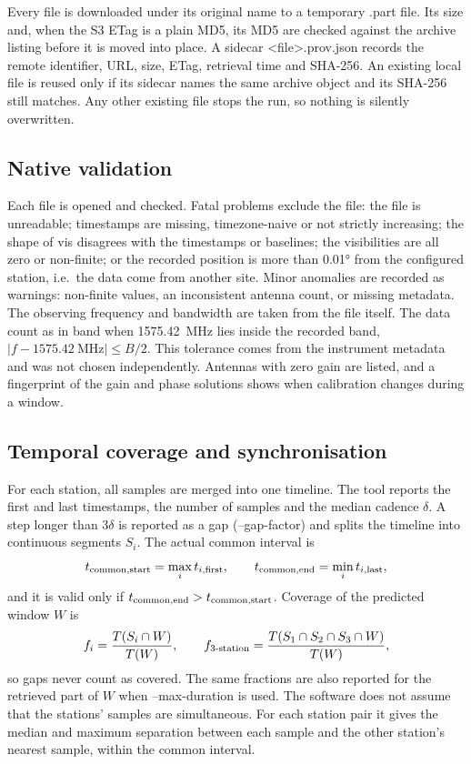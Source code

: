 \documentclass[11pt,a4paper]{article}
\newcommand{\code}[1]{{\ttfamily\def\_{\textunderscore\allowbreak}#1}}
\begin{document}
Every file is downloaded under its original name to a temporary
\code{.part} file. Its size and, when the S3 ETag is a plain MD5, its MD5
are checked against the archive listing before it is moved into place. A
sidecar \code{<file>.prov.json} records the remote identifier, URL, size,
ETag, retrieval time and SHA-256. An existing local file is reused only if
its sidecar names the same archive object and its SHA-256 still matches.
Any other existing file stops the run, so nothing is silently overwritten.

\subsection{Native validation}

Each file is opened and checked. Fatal problems exclude the file: the file
is unreadable; timestamps are missing, timezone-naive or not strictly
increasing; the shape of \code{vis} disagrees with the timestamps or
baselines; the visibilities are all zero or non-finite; or the recorded
position is more than \ang{0.01} from the configured station, i.e.\ the data
come from another site. Minor anomalies are recorded as warnings:
non-finite values, an inconsistent antenna count, or missing metadata.
The observing frequency and bandwidth are taken from the file itself. The
data count as in band when \SI{1575.42}{\mega\hertz} lies inside the
recorded band, $|f-\SI{1575.42}{\mega\hertz}|\le B/2$. This tolerance comes
from the instrument metadata and was not chosen independently. Antennas
with zero gain are listed, and a fingerprint of the gain and phase
solutions shows when calibration changes during a window.

\subsection{Temporal coverage and synchronisation}

For each station, all samples are merged into one timeline. The tool reports
the first and last timestamps, the number of samples and the median cadence
$\delta$. A step longer than $3\delta$ is reported as a gap
(\code{--gap-factor}) and splits the timeline into continuous segments
$S_i$. The actual common interval is
\begin{equation}
t_{\rm common,start}=\max_i t_{i,\rm first},\qquad
t_{\rm common,end}=\min_i t_{i,\rm last},
\end{equation}
and it is valid only if $t_{\rm common,end}>t_{\rm common,start}$. Coverage
of the predicted window $W$ is
\begin{equation}
f_i=\frac{T(S_i\cap W)}{T(W)},\qquad
f_{\rm 3\text{-}station}=\frac{T(S_1\cap S_2\cap S_3\cap W)}{T(W)},
\end{equation}
so gaps never count as covered. The same fractions are also reported for
the retrieved part of $W$ when \code{--max-duration} is used. The software
does not assume that the stations' samples are simultaneous. For each
station pair it gives the median and maximum separation between each sample
and the other station's nearest sample, within the common interval.
\end{document}
